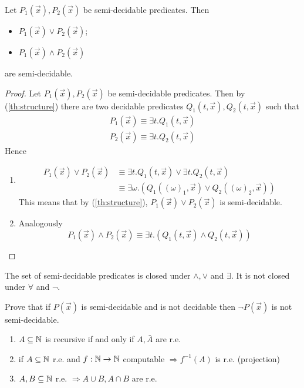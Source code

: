 \begin{theorem}
  Let $ P_1(\vec{x}), P_2(\vec{x}) $ be semi-decidable predicates. Then
  \begin{itemize}
  \item $  P_1(\vec{x}) \lor P_2(\vec{x}) $;
  \item $ P_1(\vec{x}) \land P_2(\vec{x}) $
  \end{itemize}
  are semi-decidable.
  \begin{proof}
    Let $ P_1(\vec{x}), P_2(\vec{x}) $ be semi-decidable
    predicates. Then by (\ref{th:structure}) there are two
    decidable predicates \( Q_1(t, \vec{x}), Q_2(t, \vec{x})\) such that
    \begin{gather*}
      P_1(\vec{x}) \equiv \exists t . Q_1(t, \vec{x}) \\
      P_2(\vec{x}) \equiv \exists t . Q_2(t, \vec{x})
    \end{gather*}
    Hence
    \begin{enumerate}[label=(\arabic*)]
    \item
      \[
        \begin{split}
          P_1(\vec{x}) \lor P_2(\vec{x}) &\equiv \exists t .
          Q_1(t, \vec{x}) \lor \exists t . Q_2(t, \vec{x}) \\
          &\equiv \exists \omega . (Q_1((\omega)_1, \vec{x})
          \lor Q_2((\omega)_2, \vec{x}))
        \end{split}
      \]
      This means that by (\ref{th:structure}),
      $P_1(\vec{x}) \lor P_2(\vec{x})$ is semi-decidable.
    \item Analogously
      \[
        P_1(\vec{x}) \land P_2(\vec{x}) \equiv \exists t .
        (Q_1(t, \vec{x}) \land Q_2(t, \vec{x}))
      \]
    \end{enumerate}
  \end{proof}
\end{theorem}

\begin{observation}
  The set of semi-decidable predicates is closed under $\land, \lor$
  and $\exists$. It is not closed under $\forall$ and $\lnot$.
\end{observation}

\begin{exercise}
  Prove that if $ P(\vec{x}) $ is semi-decidable and is not decidable
  then $ \lnot P(\vec{x}) $ is not semi-decidable.
\end{exercise}

\begin{observation}
  \begin{enumerate}[label=(\arabic*)]
  \item $A \subseteq \mathbb{N}$ is recursive if and only if $A, \bar{A}$ are r.e.
  \item if $A \subseteq \mathbb{N}$ r.e. and $f : \mathbb{N} \to \mathbb{N}$ computable
    $\Rightarrow f^{-1}(A)$ is r.e. (projection)
  \item $A,B \subseteq \mathbb{N}$ r.e. $\Rightarrow A \cup B, A \cap B$
    are r.e.
  \end{enumerate}
\end{observation}

